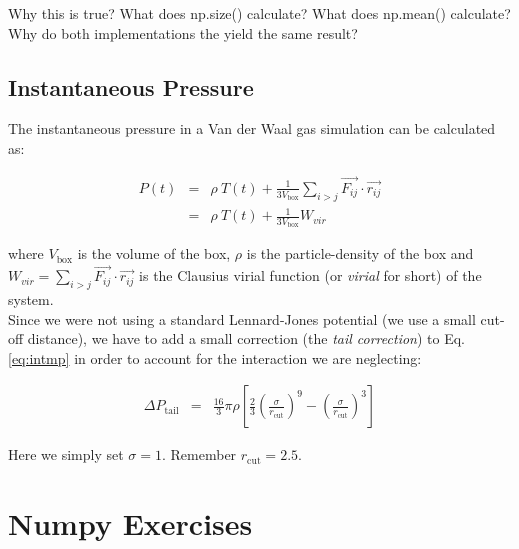 \documentclass{article}
\begin{document}
Why this is true? What does np.size() calculate? What does np.mean() calculate?
Why do both implementations the yield the same result?

\subsection{Instantaneous Pressure}

The instantaneous pressure in a Van der Waal gas simulation can be calculated
as:

\begin{eqnarray}
    P(t) & = & \rho \ T(t) + \frac{1}{3V_\mathrm{box}}  \sum_{i>j} \vec{F_{ij}} \cdot \vec{r_{ij}}\\
         & = & \rho \ T(t) + \frac{1}{3V_\mathrm{box}} W_{vir} \label{eq:intmp}
\end{eqnarray}

where $V_\mathrm{box}$ is the volume of the box, $\rho$ is the particle-density
of the box  and $W_{vir} = \sum_{i>j} \vec{F_{ij}} \cdot \vec{r_{ij}}$ is the
Clausius virial function (or \textit{virial} for short) of the system.\\

Since we were not using a standard Lennard-Jones potential (we use a small
cut-off distance), we have to add a small correction (the \textit{tail
correction}) to Eq. \ref{eq:intmp} in order to account for the interaction we are
neglecting:

\begin{eqnarray}
    \Delta P_\mathrm{tail} & = & \frac{16}{3}\pi \rho \left[ \frac{2}{3}\left( \frac{\sigma}{r_{\mathrm{cut}}} \right)^9 - \left(\frac{\sigma}{r_{\mathrm{cut}}} \right)^3 \right]
\end{eqnarray}

Here we simply set $\sigma = 1$. Remember
$r_{\mathrm{cut}} = 2.5$.

\newpage

\section{Numpy Exercises}



\end{document}
